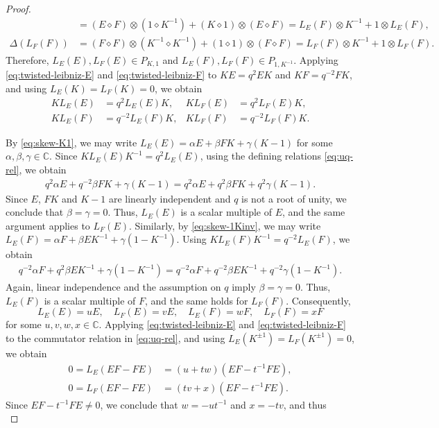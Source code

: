 \documentclass[11pt,english]{article}
\newcommand{\Del}{\Delta}
\newcommand{\act}{\mathbin{\diamond}}
\theoremstyle{definition}
\begin{document}
\begin{proof}
\[\begin{aligned}
&=(E\act F)\otimes(1\act K^{-1})
 +(K\act1)\otimes(E\act F)=L_E(F)\otimes K^{-1}+1\otimes L_E(F),\\
\Del(L_F(F))
&=(F\act F)\otimes(K^{-1}\act K^{-1})
 +(1\act1)\otimes(F\act F)=L_F(F)\otimes K^{-1}+1\otimes L_F(F).
\end{aligned}
\]
Therefore, $L_E(E),L_F(E)\in P_{K,1}$ and $L_E(F),L_F(F)\in P_{1,K^{-1}}$.
Applying \eqref{eq:twisted-leibniz-E} and
\eqref{eq:twisted-leibniz-F} to
$KE=q^2EK$ and $KF=q^{-2}FK$, and using
$L_E(K)=L_F(K)=0$, we obtain
\[
\begin{aligned}
KL_E(E)&=q^2L_E(E)K, &
KL_F(E)&=q^2L_F(E)K,\\
KL_E(F)&=q^{-2}L_E(F)K, &
KL_F(F)&=q^{-2}L_F(F)K.
\end{aligned}
\] 

By \eqref{eq:skew-K1}, we may write $L_E(E)=\alpha E+\beta FK+\gamma(K-1)$
for some $\alpha,\beta,\gamma\in\mathbb{C}$.
Since $KL_E(E)K^{-1}=q^2L_E(E)$, using
the defining relations \eqref{eq:uq-rel},
we obtain
\[
\begin{aligned}
q^2\alpha E+q^{-2}\beta FK+\gamma(K-1)=q^2\alpha E+q^2\beta FK
+q^2\gamma(K-1).
\end{aligned}
\]
Since $E$, $FK$ and $K-1$ are linearly
independent and $q$ is not a root of unity,
we conclude that $\beta=\gamma=0$.
Thus, $L_E(E)$ is a scalar multiple of $E$,
and the same argument applies to $L_F(E)$.
Similarly, by \eqref{eq:skew-1Kinv},
we may write $L_E(F)=\alpha F+\beta EK^{-1}
+\gamma(1-K^{-1}).$
Using $KL_E(F)K^{-1}=q^{-2}L_E(F)$,
we obtain
\[
\begin{aligned}
q^{-2}\alpha F+q^2\beta EK^{-1}
+\gamma(1-K^{-1})=q^{-2}\alpha F+q^{-2}\beta EK^{-1}
+q^{-2}\gamma(1-K^{-1}).
\end{aligned}
\]
Again, linear independence and the assumption
on $q$ imply $\beta=\gamma=0$.
Thus, $L_E(F)$ is a scalar multiple of $F$,
and the same holds for $L_F(F)$.
Consequently,
\[
L_E(E)=uE,\quad L_F(E)=vE,\quad
L_E(F)=wF,\quad L_F(F)=xF
\]
for some $u,v,w,x\in\mathbb{C}$.
Applying \eqref{eq:twisted-leibniz-E}
and \eqref{eq:twisted-leibniz-F} to the
commutator relation in \eqref{eq:uq-rel},
and using $L_E(K^{\pm1})=L_F(K^{\pm1})=0$,
we obtain
\[
\begin{aligned}
0=L_E(EF-FE)
&=(u+tw)(EF-t^{-1}FE),\\
0=L_F(EF-FE)
&=(tv+x)(EF-t^{-1}FE).
\end{aligned}
\]
Since $EF-t^{-1}FE\neq0$, we conclude that
$w=-ut^{-1}$ and $x=-tv$, and thus
\begin{equation}\label{eq:generator-actions}

\end{equation}
\end{proof}
\end{document}
